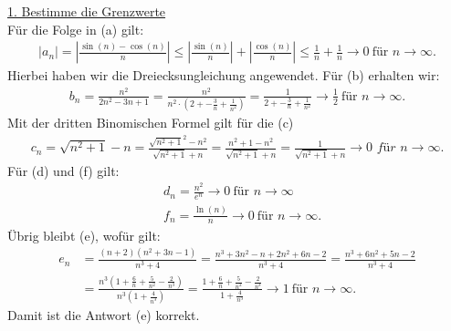 \underline{1. Bestimme die Grenzwerte}\\
Für die Folge in (a) gilt:
\begin{align*}
	|a_n| =
	\left|
	\frac{\sin(n) - \cos(n)}{n}
	\right|
	\leq
	\left|
	\frac{\sin(n)}{n}
	\right|
	+
	\left|
	\frac{\cos(n)}{n}
	\right|
	\leq 
	\frac{1}{n} + \frac{1}{n} \to 0 \ \textrm{für } n \to \infty.
\end{align*}
Hierbei haben wir die Dreiecksungleichung angewendet.
Für (b) erhalten wir:
\begin{align*}
	b_n = \frac{n^2}{2n^2 - 3n +1 }
	= \frac{n^2}{n^2 \cdot \left( 2+ -\frac{3}{n} + \frac{1}{n^2}\right)}
	=
	\frac{1}{   2+ -\frac{3}{n} + \frac{1}{n^2}}
	\to \frac{1}{2} \ \textrm{für } n \to \infty.
\end{align*}
Mit der dritten Binomischen Formel gilt für die (c)
\begin{align*}
	c_n = \sqrt{n^2 +1} - n
	= \frac{\sqrt{n^2 +1}^2  - n^2}{\sqrt{n^2 +1 } + n}
	= \frac{n^2 +1  - n^2}{\sqrt{n^2 +1 } + n}
	=
	\frac{1}{\sqrt{n^2 +1 } + n} \to 0 \textit{ für } n \to \infty.
\end{align*}
Für (d) und (f) gilt:
\begin{align*}
	&d_n = \frac{n^2}{ e^n} \to 0  \ \textrm{für } n \to \infty\\
	&f_n = \frac{\ln(n)}{n} \to 0 \ \textrm{für } n \to \infty.
\end{align*}
Übrig bleibt (e), wofür gilt:
\begin{align*}
	e_n
	&=
	\frac{(n+2) (n^2 + 3n -1)}{n^3 +4 }
	= \frac{n^3 +3 n^2 - n + 2 n^2 +6n -2}{n^3 + 4}
	= \frac{n^3 +6 n^2 +5 n -2}{n^3 + 4}\\
	&= \frac{n^3 \left( 1 +\frac{6}{n} +\frac{5 }{n^2} -\frac{2}{n^3} \right)}{n^3 \left( 1 + \frac{4}{n^3} \right)}
	=
	\frac{ 1 +\frac{6}{n} +\frac{5 }{n^2} -\frac{2}{n^3}}{  1 + \frac{4}{n^3}}
	\to 1 \ \textrm{für } n \to \infty.
\end{align*}
Damit ist die Antwort (e) korrekt.
\newpage

